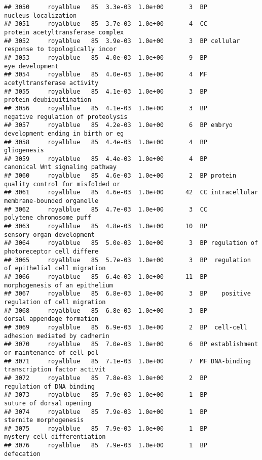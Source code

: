 \documentclass[]{article}
\begin{document}
\begin{verbatim}
## 3050     royalblue   85  3.3e-03  1.0e+00       3  BP                     nucleus localization
## 3051     royalblue   85  3.7e-03  1.0e+00       4  CC        protein acetyltransferase complex
## 3052     royalblue   85  3.9e-03  1.0e+00       3  BP cellular response to topologically incor
## 3053     royalblue   85  4.0e-03  1.0e+00       9  BP                          eye development
## 3054     royalblue   85  4.0e-03  1.0e+00       4  MF               acetyltransferase activity
## 3055     royalblue   85  4.1e-03  1.0e+00       3  BP                 protein deubiquitination
## 3056     royalblue   85  4.1e-03  1.0e+00       3  BP       negative regulation of proteolysis
## 3057     royalblue   85  4.2e-03  1.0e+00       6  BP embryo development ending in birth or eg
## 3058     royalblue   85  4.4e-03  1.0e+00       4  BP                              gliogenesis
## 3059     royalblue   85  4.4e-03  1.0e+00       4  BP          canonical Wnt signaling pathway
## 3060     royalblue   85  4.6e-03  1.0e+00       2  BP protein quality control for misfolded or
## 3061     royalblue   85  4.6e-03  1.0e+00      42  CC intracellular membrane-bounded organelle
## 3062     royalblue   85  4.7e-03  1.0e+00       3  CC                 polytene chromosome puff
## 3063     royalblue   85  4.8e-03  1.0e+00      10  BP                sensory organ development
## 3064     royalblue   85  5.0e-03  1.0e+00       3  BP regulation of photoreceptor cell differe
## 3065     royalblue   85  5.7e-03  1.0e+00       3  BP  regulation of epithelial cell migration
## 3066     royalblue   85  6.4e-03  1.0e+00      11  BP           morphogenesis of an epithelium
## 3067     royalblue   85  6.8e-03  1.0e+00       3  BP    positive regulation of cell migration
## 3068     royalblue   85  6.8e-03  1.0e+00       3  BP               dorsal appendage formation
## 3069     royalblue   85  6.9e-03  1.0e+00       2  BP  cell-cell adhesion mediated by cadherin
## 3070     royalblue   85  7.0e-03  1.0e+00       6  BP establishment or maintenance of cell pol
## 3071     royalblue   85  7.1e-03  1.0e+00       7  MF DNA-binding transcription factor activit
## 3072     royalblue   85  7.8e-03  1.0e+00       2  BP                regulation of DNA binding
## 3073     royalblue   85  7.9e-03  1.0e+00       1  BP                 suture of dorsal opening
## 3074     royalblue   85  7.9e-03  1.0e+00       1  BP                   sternite morphogenesis
## 3075     royalblue   85  7.9e-03  1.0e+00       1  BP             mystery cell differentiation
## 3076     royalblue   85  7.9e-03  1.0e+00       1  BP                               defecation

\end{verbatim}
\end{document}
